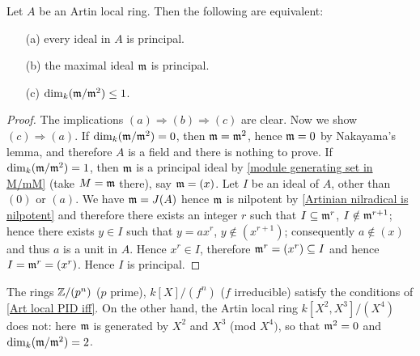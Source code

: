 \begin{proposition}\label{Art local PID iff}
Let $A$ be an Artin local ring. Then the following are equivalent:
\begin{itemize}
\item[(a)] every ideal in $A$ is principal.
\item[(b)] the maximal ideal $\mathfrak{m}$ is principal.
\item[(c)] $\dim_k(\mathfrak{m}/\mathfrak{m}^2)\leq 1$.
\end{itemize}
\end{proposition}
\begin{proof}
The implications $(a)\Rightarrow(b)\Rightarrow(c)$ are clear. Now we show $(c)\Rightarrow(a)$. If $\dim_k(\mathfrak{m}/\mathfrak{m}^2)=0$, then $\mathfrak{m}=\mathfrak{m}^2$, hence $\mathfrak{m}=0$ by Nakayama's lemma, and therefore $A$ is a field and there is nothing to prove. If $\dim_k(\mathfrak{m}/\mathfrak{m}^2)=1$, then $\mathfrak{m}$ is a principal ideal by \cref{module generating set in M/mM} (take $M=\mathfrak{m}$ there), say $\mathfrak{m}=(x)$. Let $I$ be an ideal of $A$, other than $(0)$ or $(a)$. We have $\mathfrak{m}=J(A)$ hence $\mathfrak{m}$ is nilpotent by \cref{Artinian nilradical is nilpotent} and therefore there exists an integer $r$ such that $I\subseteq\mathfrak{m}^r$, $I\notin\mathfrak{m}^{r+1}$; hence there exists $y\in I$ such that $y=ax^r$, $y\notin(x^{r+1})$; consequently $a\notin(x)$ and thus $a$ is a unit in $A$. Hence $x^r\in I$, therefore $\mathfrak{m}^r=(x^r)\subseteq I$ and hence $I=\mathfrak{m}^r=(x^r)$. Hence $I$ is principal.
\end{proof}
\begin{example}
The rings $\mathbb{Z}/(p^n)$ ($p$ prime), $k[X]/(f^n)$ ($f$ irreducible) satisfy the conditions of \cref{Art local PID iff}. On the other hand, the Artin local ring $k[X^2,X^3]/(X^4)$ does not: here $\mathfrak{m}$ is generated by $X^2$ and $X^3$ (mod $X^4)$, so that $\mathfrak{m}^2=0$ and $\dim_k(\mathfrak{m}/\mathfrak{m}^2)=2$.
\end{example}
